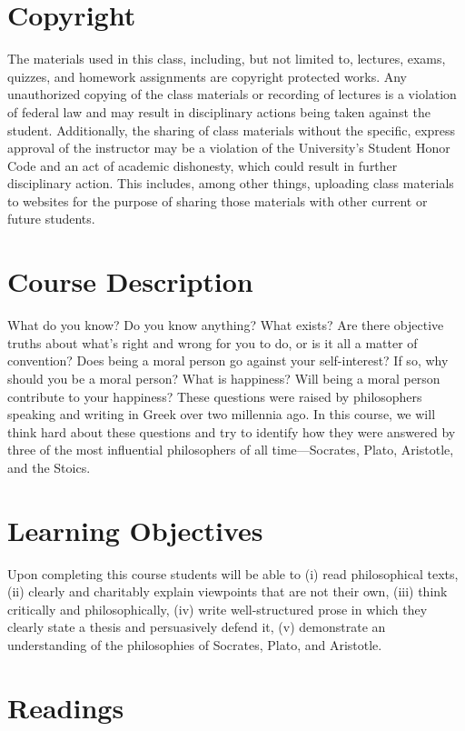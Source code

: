 \documentclass[article,oneside]{memoir}
\begin{document}
\section{Copyright}
The materials used in this class, including, but not limited to, lectures, exams, quizzes, and homework assignments are copyright protected works.  Any unauthorized copying of the class materials or recording of lectures is a violation of federal law and may result in disciplinary actions being taken against the student.  Additionally, the sharing of class materials without the specific, express approval of the instructor may be a violation of the University's Student Honor Code and an act of academic dishonesty, which could result in further disciplinary action.  This includes, among other things, uploading class materials to websites for the purpose of sharing those materials with other current or future students. 

\section{Course Description}

What do you know? Do you know anything? What exists? Are there objective truths about what’s right and wrong for you to do, or is it all a matter of convention? Does being a moral person go against your self-interest? If so, why should you be a moral person? What is happiness? Will being a moral person contribute to your happiness? These questions were raised by philosophers speaking and writing in Greek over two millennia ago. In this course, we will think hard about these questions and try to identify how they were answered by three of the most influential philosophers of all time---Socrates, Plato, Aristotle, and the Stoics. 

\section{Learning Objectives}

Upon completing this course students will be able to (i) read philosophical texts, (ii) clearly and charitably explain viewpoints that
are not their own, (iii) think critically and philosophically, (iv) write well-structured prose in which they clearly state a thesis and persuasively defend it, (v) demonstrate an understanding of the philosophies of Socrates, Plato, and Aristotle.


\section{Readings}
\end{document}
